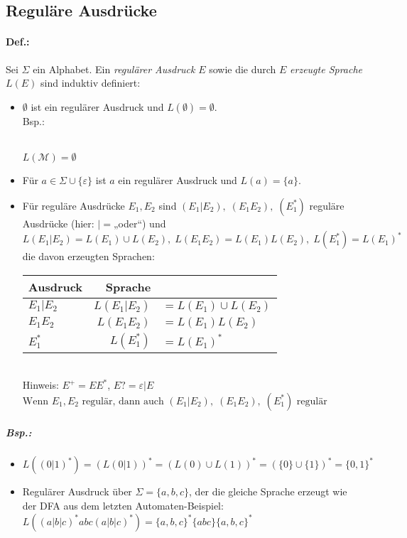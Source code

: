\documentclass{scrreprt}
\begin{document}
\subsection{Reguläre Ausdrücke}
\paragraph{Def.:} Sei $\Sigma$ ein Alphabet. Ein \emph{regulärer Ausdruck} $E$ sowie die durch $E$ \emph{erzeugte Sprache $L(E)$} sind induktiv definiert:
\begin{itemize}
\item $\emptyset$ ist ein regulärer Ausdruck und $L(\emptyset)=\emptyset$.\\
Bsp.: \\
\\
$L(\mathcal{M})=\emptyset$
\item Für $a \in \Sigma \cup \{\varepsilon\}$ ist $a$ ein regulärer Ausdruck und $L(a)=\{a\}$.
\item Für reguläre Ausdrücke $E_1, E_2$ sind $(E_1 | E_2), \; (E_1 E_2), \; (E_1^*)$ reguläre Ausdrücke (hier: $|=$„oder“) und $L(E_1|E_2)=L(E_1)\cup L(E_2), \; L(E_1E_2)=L(E_1)L(E_2), \; L(E_1^*)=L(E_1)^*$ die davon erzeugten Sprachen:\\
\begin{tabular}{l | r l}
Ausdruck & Sprache &\\
\hline
$E_1 | E_2$ & $L(E_1|E_2)$&$=L(E_1)\cup L(E_2)$\\
$E_1 E_2$ & $L(E_1E_2)$&$=L(E_1)L(E_2)$\\
$E_1^*$ & $L(E_1^*)$&$=L(E_1)^*$\\
\end{tabular}\medskip\\
Hinweis: $E^+=E E^*$, $E?=\varepsilon|E$\\
$\boxed{\text{Wenn }E_1, E_2 \text{ regulär, dann auch } (E_1 | E_2), \; (E_1 E_2), \; (E_1^*) \text{ regulär}}$
\end{itemize}
\subparagraph{Bsp.:} 
\begin{itemize}
\item $L( (0|1)^*) =(L(0|1))^*=(L(0)\cup L(1))^*=(\{0\}\cup\{1\})^*=\{0,1\}^*$
\item Regulärer Ausdruck über $\Sigma=\{a,b,c\}$, der die gleiche Sprache erzeugt wie der DFA aus dem letzten Automaten-Beispiel:\\
$L((a|b|c)^*abc(a|b|c)^*)=\{a,b,c\}^*\{abc\}\{a,b,c\}^*$
\end{itemize}
\end{document}
